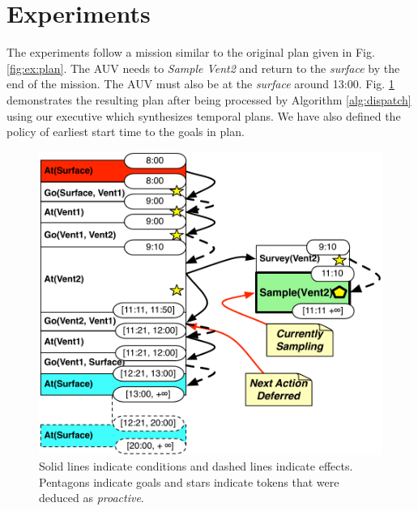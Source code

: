 \section{Experiments}
\label{sec:exp}

The experiments follow a mission similar to the original plan given in
Fig. \ref{fig:ex:plan}. The AUV needs to {\em Sample Vent2} and return
to the {\em surface} by the end of the mission. The AUV must also be
at the {\em surface} around
13:00. %
Fig. \ref{fig:ex:mixed1} demonstrates the resulting plan after being
processed by Algorithm \ref{alg:dispatch} using our executive \rx
which synthesizes temporal plans. We have also defined the policy
of earliest start time to the goals in plan.

\begin{figure}[!htbp]
  \centering
  \includegraphics[width=0.9\columnwidth]{figs/example_MixedInitial}
  \vskip-2mm
  \caption{\small Solid lines indicate conditions and dashed lines
    indicate effects. Pentagons indicate goals and stars
    indicate tokens that were deduced as {\em proactive}.}
  \label{fig:ex:mixed1}
  \vskip-3mm
\end{figure}



